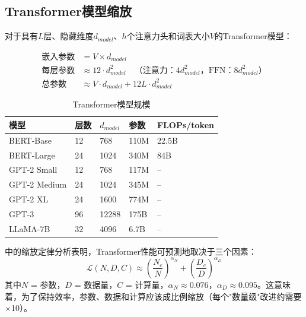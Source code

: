 \subsection{Transformer模型缩放}

对于具有$L$层、隐藏维度$d_{model}$、$h$个注意力头和词表大小$V$的Transformer模型：

\begin{align}
\text{嵌入参数} &= V \times d_{model} \\
\text{每层参数} &\approx 12 \cdot d_{model}^2 \quad \text{（注意力：} 4d_{model}^2 \text{，FFN：} 8d_{model}^2\text{）} \\
\text{总参数} &\approx V \cdot d_{model} + 12 L \cdot d_{model}^2
\end{align}

\begin{table}[ht]
    \centering
    \caption{Transformer模型规模}
    \begin{tabular}{L{2.5cm} L{1.5cm} L{2cm} L{2cm} L{2cm}}
        \toprule
        \textbf{模型} & \textbf{层数} & $d_{model}$ & \textbf{参数} & \textbf{FLOPs/token} \\
        \midrule
        BERT-Base & 12 & 768 & 110M & 22.5B \\
        BERT-Large & 24 & 1024 & 340M & 84B \\
        GPT-2 Small & 12 & 768 & 117M & -- \\
        GPT-2 Medium & 24 & 1024 & 345M & -- \\
        GPT-2 XL & 24 & 1600 & 774M & -- \\
        GPT-3 & 96 & 12288 & 175B & -- \\
        LLaMA-7B & 32 & 4096 & 6.7B & -- \\
        \bottomrule
    \end{tabular}
\end{table}

\begin{note}[缩放定律]
\cite{kaplan2020scaling}中的缩放定律分析表明，Transformer性能可预测地取决于三个因素：
\begin{equation}
\mathcal{L}(N, D, C) \approx \left(\frac{N_c}{N}\right)^{\alpha_N} + \left(\frac{D_c}{D}\right)^{\alpha_D}
\end{equation}
其中$N$ = 参数，$D$ = 数据量，$C$ = 计算量，$\alpha_N \approx 0.076$，$\alpha_D \approx 0.095$。这意味着，为了保持效率，参数、数据和计算应该成比例缩放（每个"数量级"改进约需要$\times$10）。
\end{note}

